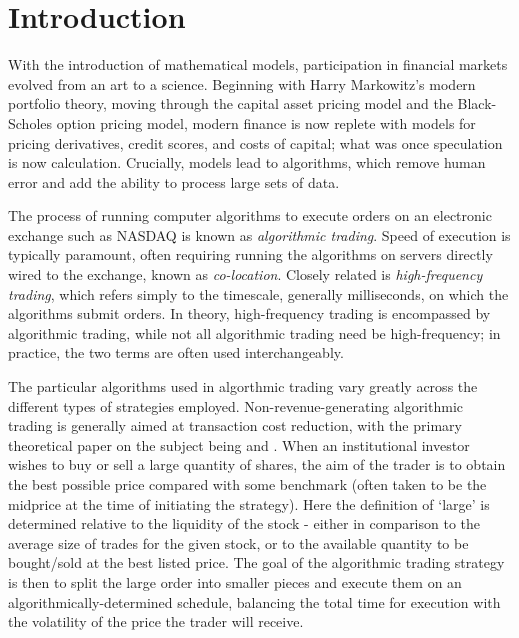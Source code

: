 \chapter{Introduction}

With the introduction of mathematical models, participation in financial markets evolved from an art to a science. Beginning with Harry Markowitz's modern portfolio theory, moving through the capital asset pricing model and the Black-Scholes option pricing model, modern finance is now replete with models for pricing derivatives, credit scores, and costs of capital; what was once speculation is now calculation. Crucially, models lead to algorithms, which remove human error and add the ability to process large sets of data. 

The process of running computer algorithms to execute orders on an electronic exchange such as NASDAQ is known as \emph{algorithmic trading}. Speed of execution is typically paramount, often requiring running the algorithms on servers directly wired to the exchange, known as \emph{co-location}. Closely related is \emph{high-frequency trading}, which refers simply to the timescale, generally milliseconds, on which the algorithms submit orders. In theory, high-frequency trading is encompassed by algorithmic trading, while not all algorithmic trading need be high-frequency; in practice, the two terms are often used interchangeably. 

The particular algorithms used in algorthmic trading vary greatly across the different types of strategies employed. Non-revenue-generating algorithmic trading is generally aimed at transaction cost reduction, with the primary theoretical paper on the subject being \citet{Bertsimas98} and \citet{Almgren01}. When an institutional investor wishes to buy or sell a large quantity of shares, the aim of the trader is to obtain the best possible price compared with some benchmark (often taken to be the midprice at the time of initiating the strategy). Here the definition of `large' is determined relative to the liquidity of the stock - either in comparison to the average size of trades for the given stock, or to the available quantity to be bought/sold at the best listed price. The goal of the algorithmic trading strategy is then to split the large order into smaller pieces and execute them on an algorithmically-determined schedule, balancing the total time for execution with the volatility of the price the trader will receive. 

